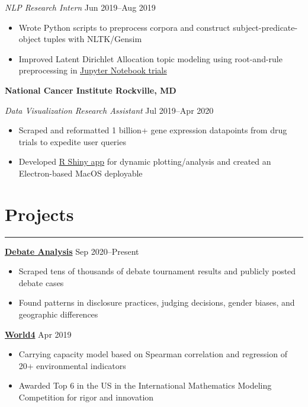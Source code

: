 \documentclass[11pt]{article}
\newcommand{\resumesection}[1]{\vspace{-0.3cm}\section*{\color{highlight}#1}\vspace{-0.3cm}\hrule\vspace{0.3cm}}
\begin{document}
\textit{NLP Research Intern} \hfill Jun 2019--Aug 2019
\begin{itemize}
	\item Wrote Python scripts to preprocess corpora and construct subject-predicate-object tuples with NLTK/Gensim
	\item Improved Latent Dirichlet Allocation topic modeling using root-and-rule preprocessing in \href{https://github.com/petezh/RR-NLP-Tools}{Jupyter Notebook trials}
\end{itemize}\vspace{0.1cm}

\textbf{National Cancer Institute \hfill Rockville, MD}\par

\textit{Data Visualization Research Assistant} \hfill Jul 2019--Apr 2020 \par
\begin{itemize}
	\item Scraped and reformatted 1 billion+ gene expression datapoints from drug trials to expedite user queries
	\item Developed \href{https://github.com/petezh/TP-Workbench}{R Shiny app} for dynamic plotting/analysis and created an Electron-based MacOS deployable
\end{itemize}

\resumesection{Projects}

\textbf{\href{https://github.com/petezh/Disclosure}{Debate Analysis}} \hfill Sep 2020--Present\par
\begin{itemize}
	\item Scraped tens of thousands of debate tournament results and publicly posted debate cases
	\item Found patterns in disclosure practices, judging decisions, gender biases, and geographic differences
\end{itemize}\vspace{0.1cm} \par

\textbf{\href{https://github.com/gautomdas/IMMC-World4/blob/master/US-9365.pdf}{World4}} \hfill Apr 2019\par
\begin{itemize}
	\item Carrying capacity model based on Spearman correlation and regression of 20+ environmental indicators
	\item Awarded Top 6 in the US in the International Mathematics Modeling Competition for rigor and innovation
\end{itemize}\vspace{0.1cm} \par
\end{document}
